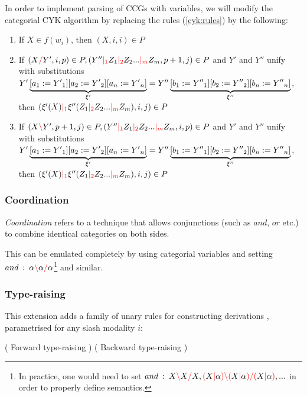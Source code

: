 \documentclass[main.tex]{subfiles}
\begin{document}
In order to implement parsing of CCGs with variables, we will modify the categorial
CYK algorithm by replacing the rules (\cref{cyk:rules}) by the following:

\begin{enumerate}
    \item If $X \in f(w_i)$, then $(X, i, i) \in P$
    \item If $(X \textcolor{red}{/} Y', i, p) \in P, (Y'' \textcolor{red}{|_{1}} Z_1 \textcolor{red}{|_{2}} Z_2 ... \textcolor{red}{|_{m}} Z_m, p + 1, j) \in P$
        and $Y'$ and $Y''$ unify with substitutions
        $ {Y'} \underbrace{ [ a_1 := {Y'}_1 ] [ a_2 := {Y'}_2 ] [ a_n := {Y'}_n ]}_{\xi'}
        = {Y''}\underbrace{ [ b_1 := {Y''}_1 ] [ b_2 := {Y''}_2 ] [ b_n := {Y''}_n ]}_{\xi''}$, \\
        then $(\xi'(X) \textcolor{red}{|_{1}} \xi''(Z_1 \textcolor{red}{|_{2}} Z_2 ... \textcolor{red}{|_{m}} Z_m), i, j) \in P$
    \item If $(X \textcolor{red}{\backslash} Y', p + 1, j) \in P, (Y'' \textcolor{red}{|_{1}} Z_1 \textcolor{red}{|_{2}} Z_2 ... \textcolor{red}{|_{m}} Z_m, i, p) \in P$
        and $Y'$ and $Y''$ unify with substitutions
        $ {Y'} \underbrace{ [ a_1 := {Y'}_1 ] [ a_2 := {Y'}_2 ] [ a_n := {Y'}_n ]}_{\xi'}
        = {Y''}\underbrace{ [ b_1 := {Y''}_1 ] [ b_2 := {Y''}_2 ] [ b_n := {Y''}_n ]}_{\xi''}$, \\
        then $(\xi'(X) \textcolor{red}{|_{1}} \xi''(Z_1 \textcolor{red}{|_{2}} Z_2 ... \textcolor{red}{|_{m}} Z_m), i, j) \in P$
\end{enumerate}

\subsubsection{Coordination}
\emph{Coordination} refers to a technique that allows conjunctions (such as
$and$, $or$ etc.) to combine identical categories on both sides.

This can be emulated completely by using categorial variables and setting
$and \hspace{0.5em} {:} \hspace{0.5em} \alpha \textcolor{red}{\backslash} \alpha \textcolor{red}{/} \alpha $\footnote{
    In practice, one would need to set
    $and \hspace{0.5em} {:} \hspace{0.5em} X \textcolor{red}{\backslash} X \textcolor{red}{/} X, \textcolor{red}{(} X \textcolor{red}{|} \alpha \textcolor{red}{)} \textcolor{red}{\backslash} \textcolor{red}{(} X \textcolor{red}{|} \alpha \textcolor{red}{)} \textcolor{red}{/} \textcolor{red}{(} X \textcolor{red}{|} \alpha \textcolor{red}{)}, ...$
    in order to properly define semantics.
} and similar.

\subsubsection{Type-raising}
This extension adds a family of unary rules for constructing derivations \cite[sec.~5.3.1]{nts},
parametrised for any slash modality $i$:
\begin{center}
        ( Forward type-raising )
        ( Backward type-raising )
\end{center}
\end{document}
